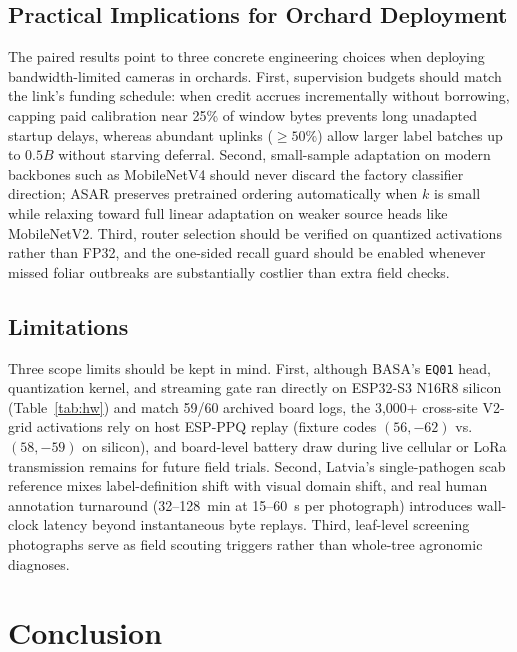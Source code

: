 \documentclass[preprint,12pt,authoryear]{elsarticle}
\begin{document}
\subsection{Practical Implications for Orchard Deployment}
The paired results point to three concrete engineering choices when deploying bandwidth-limited cameras in orchards. First, supervision budgets should match the link's funding schedule: when credit accrues incrementally without borrowing, capping paid calibration near 25\% of window bytes prevents long unadapted startup delays, whereas abundant uplinks ($\ge 50\%$) allow larger label batches up to $0.5B$ without starving deferral. Second, small-sample adaptation on modern backbones such as MobileNetV4 should never discard the factory classifier direction; ASAR preserves pretrained ordering automatically when $k$ is small while relaxing toward full linear adaptation on weaker source heads like MobileNetV2. Third, router selection should be verified on quantized activations rather than FP32, and the one-sided recall guard should be enabled whenever missed foliar outbreaks are substantially costlier than extra field checks.

\subsection{Limitations}
Three scope limits should be kept in mind. First, although BASA's \texttt{EQ01} head, quantization kernel, and streaming gate ran directly on ESP32-S3 N16R8 silicon (Table~\ref{tab:hw}) and match 59/60 archived board logs, the 3,000+ cross-site V2-grid activations rely on host ESP-PPQ replay (fixture codes $(56,-62)$ vs.\ $(58,-59)$ on silicon), and board-level battery draw during live cellular or LoRa transmission remains for future field trials. Second, Latvia's single-pathogen scab reference mixes label-definition shift with visual domain shift, and real human annotation turnaround (32--128~min at 15--60~s per photograph) introduces wall-clock latency beyond instantaneous byte replays. Third, leaf-level screening photographs serve as field scouting triggers rather than whole-tree agronomic diagnoses.

\section{Conclusion}
\label{sec:conclusion}
\end{document}
